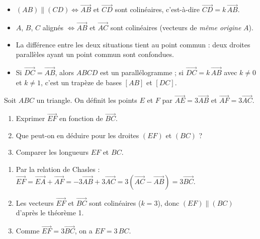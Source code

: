 \documentclass[11pt]{article}
\newcommand{\cle}[1]{{\popxbold\color{popdark}#1}}
\begin{document}
\begin{aretenir}
\begin{itemize}
\item $(AB) \parallel (CD) \iff \overrightarrow{AB}$ et $\overrightarrow{CD}$ sont colinéaires, c'est-à-dire $\overrightarrow{CD} = k\,\overrightarrow{AB}$.
\item $A$, $B$, $C$ alignés $\iff \overrightarrow{AB}$ et $\overrightarrow{AC}$ sont colinéaires (vecteurs de \emph{même origine} $A$).
\item La différence entre les deux situations tient au \cle{point commun} : deux droites parallèles ayant un point commun sont confondues.
\item Si $\overrightarrow{DC} = \overrightarrow{AB}$, alors $ABCD$ est un parallélogramme ; si $\overrightarrow{DC} = k\,\overrightarrow{AB}$ avec $k \neq 0$ et $k \neq 1$, c'est un trapèze de bases $[AB]$ et $[DC]$.
\end{itemize}
\end{aretenir}

\begin{exercice}
Soit $ABC$ un triangle. On définit les points $E$ et $F$ par $\overrightarrow{AE} = 3\overrightarrow{AB}$ et $\overrightarrow{AF} = 3\overrightarrow{AC}$.
\begin{enumerate}
\item Exprimer $\overrightarrow{EF}$ en fonction de $\overrightarrow{BC}$.
\item Que peut-on en déduire pour les droites $(EF)$ et $(BC)$ ?
\item Comparer les longueurs $EF$ et $BC$.
\end{enumerate}
\end{exercice}

\begin{corrige}
\begin{enumerate}
\item Par la relation de Chasles : $\overrightarrow{EF} = \overrightarrow{EA} + \overrightarrow{AF} = -3\overrightarrow{AB} + 3\overrightarrow{AC} = 3\left(\overrightarrow{AC} - \overrightarrow{AB}\right) = 3\overrightarrow{BC}$.
\item Les vecteurs $\overrightarrow{EF}$ et $\overrightarrow{BC}$ sont colinéaires ($k = 3$), donc $(EF) \parallel (BC)$ d'après le théorème 1.
\item Comme $\overrightarrow{EF} = 3\overrightarrow{BC}$, on a $EF = 3\,BC$.
\end{enumerate}
\end{corrige}
\end{document}
